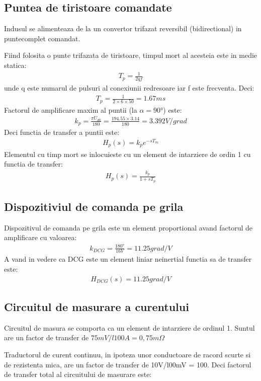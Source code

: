 \documentclass[11pt]{article}
\begin{document}
\subsection{Puntea de tiristoare comandate}
Indusul se alimenteaza de la un convertor trifazat reversibil (bidirectional) in puntecomplet comandat.

Fiind folosita o punte trifazata de tiristoare, timpul mort al acesteia este in medie statica:
\begin{align*}
T_p=\frac{1}{2qf}
\end{align*}
unde q este numarul de pulsuri al conexiunii redresoare iar f este frecventa.
Deci:
\begin{align*}
T_p=\frac{1}{2\times 6 \times 50}=1.67ms
\end{align*}
Factorul de amplificare maxim al puntii (la $\alpha = \ang{90}$) este:
\begin{align*}
k_p=\frac{\pi U_{d0}}{180}=\frac{194.55\times 3.14}{180}=3.392 V/grad
\end{align*}
Deci functia de transfer a puntii este:
\begin{align*}
H_p(s)=k_pe^{-sT_m}
\end{align*}
Elementul cu timp mort se inlocuieste cu un element de intarziere de ordin 1 cu functia de transfer:
\begin{align*}
H_p(s)=\frac{k_p}{1+sT_p}
\end{align*}
\subsection{Dispozitiviul de comanda pe grila}
Dispozitivul de comanda pe grila este un element proportional avand factorul de amplificare cu valoarea:
\begin{align*}
k_{DCG}=\frac{\ang{180}}{16V}=11.25 grad/V
\end{align*}
A vand in vedere ca DCG este un element liniar neinertial functia sa de transfer este:
\begin{align*}
H_{DCG}(s)=11.25 grad/V
\end{align*}
\subsection{Circuitul de masurare a curentului}
Circuitul de masura se comporta ca un element de intarziere de ordinul 1. Suntul are un factor de transfer de $75mV/l100A = 0,75m\Omega$

Traductorul de curent continuu, in ipoteza unor conductoare de racord scurte si de rezistenta mica, are un factor de transfer de 10V/l00mV = 100. Deci factorul de transfer total al circuitului de masurare este:
\end{document}
